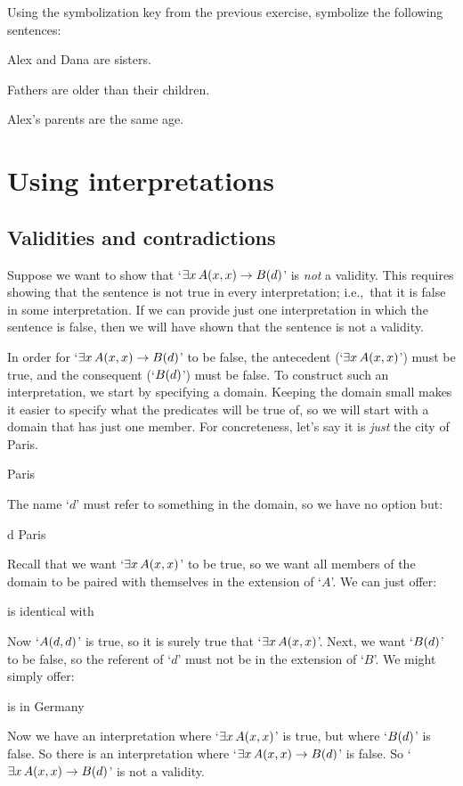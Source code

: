 \problempart
Using the symbolization key from the previous
exercise, symbolize the following sentences:
\begin{compactlist}
	\item Alex and Dana are sisters.
	\item Fathers are older than their children.
	\item Alex's parents are the same age.
\end{compactlist}


\chapter{Using interpretations}
\label{sec.UsingModels}

\section{Validities and contradictions}
Suppose we want to show that `$\exists x\, \mathord{A}(x,x) \rightarrow \mathord{B}(d)$' is \emph{not} a validity. This requires showing that the sentence is not true in every interpretation; i.e.,\ that it is false in some interpretation. If we can provide just one interpretation in which the sentence is false, then we will have shown that the sentence is not a validity.

In order for `$\exists x\,\mathord{A}(x,x) \rightarrow \mathord{B}(d)$' to be false, the antecedent (`$\exists x\, \mathord{A}(x,x)$') must be true, and the consequent (`$\mathord{B}(d)$') must be false. To construct such an interpretation, we start by specifying a domain. Keeping the domain small makes it easier to specify what the predicates will be true of, so we will start with a domain that has just one member. For concreteness, let's say it is \emph{just} the city of Paris.
	\begin{ekey}
		\item[\text{domain}] Paris
	\end{ekey}
The name `$d$' must refer to something in the domain, so we have no option but:
	\begin{ekey}
		\item[d] Paris
	\end{ekey}
Recall that we want `$\exists x\, \mathord{A}(x,x)$' to be true, so we want all members of the domain to be paired with themselves in the extension of `$A$'. We can just offer:
	\begin{ekey}
		\item[\atom{A}{x,y}]  is identical with 
	\end{ekey}
Now `$\mathord{A}(d,d)$' is true, so it is surely true that `$\exists x\, \mathord{A}(x,x)$'. Next, we want `$\mathord{B}(d)$' to be false, so the referent of `$d$' must not be in the extension of `$B$'. We might simply offer:
	\begin{ekey}
		\item[\atom{B}{x}]  is in Germany
	\end{ekey}
Now we have an interpretation where `$\exists x\, \mathord{A}(x,x)$' is true, but where `$\mathord{B}(d)$' is false. So there is an interpretation where `$\exists x\, \mathord{A}(x,x) \rightarrow \mathord{B}(d)$' is false. So `$\exists x\, \mathord{A}(x,x) \rightarrow \mathord{B}(d)$' is not a validity.


